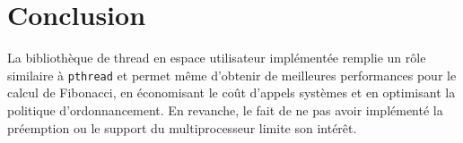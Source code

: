 \section*{Conclusion}

La bibliothèque de thread en espace utilisateur implémentée remplie un rôle similaire à \texttt{pthread} et permet même d'obtenir de meilleures performances pour le calcul de Fibonacci, en économisant le coût d'appels systèmes et en optimisant la politique d'ordonnancement. En revanche, le fait de ne pas avoir implémenté la préemption ou le support du multiprocesseur limite son intérêt.